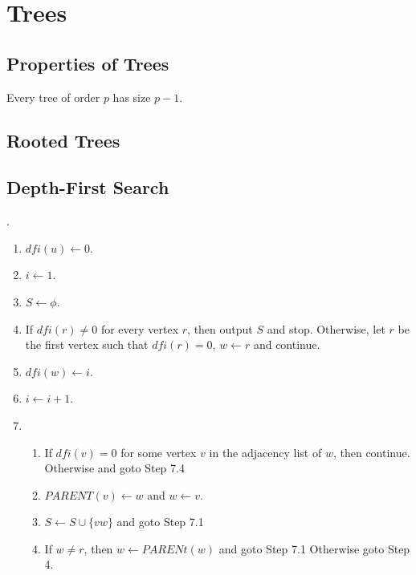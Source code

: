 \section{Trees}
\subsection{Properties of Trees}
\begin{theorem}
	Every tree of order $p$ has size $p-1$.
\end{theorem}
\subsection{Rooted Trees}
\subsection{Depth-First Search}
\begin{algorithm}.\\
\begin{enumerate}
	\item $dfi(u) \leftarrow 0$.
	\item $i \leftarrow 1$.
	\item $S \leftarrow \phi$.
	\item If $dfi(r) \ne 0$ for every vertex $r$, then output $S$ and stop. Otherwise, let $r$ be the first vertex such that $dfi(r) = 0$, $w \leftarrow r$ and continue.
	\item $ dfi(w) \leftarrow i$.
	\item $i \leftarrow i+1$.
	\item 
		\begin{enumerate}[label=7.\arabic*]
			\item If $dfi(v) = 0$ for some vertex $v$ in the adjacency list of $w$, then continue. Otherwise and goto Step 7.4 
			\item $PARENT(v) \leftarrow w$ and $w \leftarrow v$.
			\item $S \leftarrow S \cup \{ vw \}$ and goto Step 7.1
			\item If $w \ne r$, then $w \leftarrow PARENt(w)$ and goto Step 7.1 Otherwise goto Step 4.
		\end{enumerate}
\end{enumerate}
\end{algorithm}

